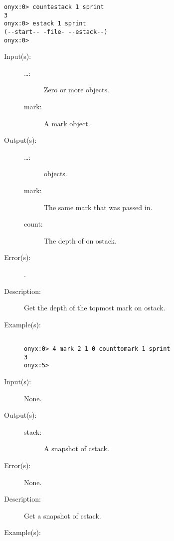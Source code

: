 \begin{description}
\begin{description}
\begin{verbatim}
onyx:0> countestack 1 sprint
3
onyx:0> estack 1 sprint
(--start-- -file- --estack--)
onyx:0>
		\end{verbatim}
	\end{description}
\label{systemdict:counttomark}
\item[{\onyxop{mark \dots}{counttomark}{mark \dots count}}: ]
	\begin{description}\item[]
	\item[Input(s): ]
		\begin{description}\item[]
		\item[\dots: ]
			Zero or more objects.
		\item[mark: ]
			A mark object.
		\end{description}
	\item[Output(s): ]
		\begin{description}\item[]
		\item[\dots: ]
			 objects.
		\item[mark: ]
			The same mark that was passed in.
		\item[count: ]
			The depth of  on ostack.
		\end{description}
	\item[Error(s): ]
		\begin{description}\item[]
		\item[.]
		\end{description}
	\item[Description: ]
		Get the depth of the topmost mark on ostack.
	\item[Example(s): ]\begin{verbatim}

onyx:0> 4 mark 2 1 0 counttomark 1 sprint
3
onyx:5>
		\end{verbatim}
	\end{description}
\label{systemdict:cstack}
\item[{\onyxop{--}{cstack}{stack}}: ]
	\begin{description}\item[]
	\item[Input(s): ] None.
	\item[Output(s): ]
		\begin{description}\item[]
		\item[stack: ]
			A snapshot of cstack.
		\end{description}
	\item[Error(s): ] None.
	\item[Description: ]
		Get a snapshot of cstack.
	\item[Example(s): ]\begin{verbatim}


\end{verbatim}
\end{description}
\end{description}
